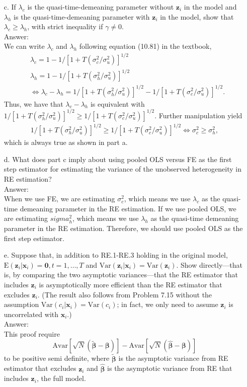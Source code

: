 \documentclass[10pt]{article}
\newcommand{\E}{\text{E}}
\newcommand{\V}{\text{Var}}
\newcommand{\Av}{\text{Avar}}
\begin{document}
\begin{enumerate}
\item[c.] If $\lambda_c$ is the quasi-time-demeaning parameter without $\textbf{z}_i$ in the model and $\lambda_h$ is the quasi-time-demeaning parameter with $\textbf{z}_i$ in the model, show that $\lambda_c\geq\lambda_h$, with strict inequality if $\gamma\neq0$. 
\\ Answer: \\
We can write $\lambda_c$ and $\lambda_h$ following equation (10.81) in the textbook,
\begin{align*}
    &\lambda_c=1-{1/[1+T(\sigma_c^2/\sigma_u^2)]}^{1/2}\\
    &\lambda_h=1-{1/[1+T(\sigma_h^2/\sigma_u^2)]}^{1/2}\\
    &\Leftrightarrow \lambda_c-\lambda_h={1/[1+T(\sigma_h^2/\sigma_u^2)]}^{1/2}-{1/[1+T(\sigma_c^2/\sigma_u^2)]}^{1/2}.
\end{align*}
Thus, we have that $\lambda_c-\lambda_h$ is equivalent with ${1/[1+T(\sigma_h^2/\sigma_u^2)]}^{1/2}\geq{1/[1+T(\sigma_c^2/\sigma_u^2)]}^{1/2}$. Further manipulation yield
\begin{align*}
    {1/[1+T(\sigma_h^2/\sigma_u^2)]}^{1/2}\geq{1/[1+T(\sigma_c^2/\sigma_u^2)]}^{1/2}\Leftrightarrow
    \sigma_c^2\geq\sigma_h^2,
\end{align*}
which is always true as shown in part a.

\item[d.] What does part c imply about using pooled OLS versus FE as the first step estimator for estimating the variance of the unobserved heterogeneity in RE estimation? 
\\ Answer: \\
When we use FE, we are estimating $\sigma_c^2$, which means we use $\lambda_c$ as the quasi-time demeaning parameter in the RE estimation. If we use pooled OLS, we are estimating $sigma_h^2$, which means we use  $\lambda_h$ as the quasi-time demeaning parameter in the RE estimation. Therefore, we should use pooled OLS as the first step estimator.

\item[e.] Suppose that, in addition to RE.1-RE.3 holding in the original model, $\E(\textbf{z}_i|\textbf{x}_i)=\textbf{0}, t=1,\ldots,T$ and $\V(\textbf{z}_i|\textbf{x}_i)=\V(\textbf{z}_i)$. Show directly---that is, by comparing the two asymptotic variances---that the RE estimator that includes $\textbf{z}_i$ is asymptotically more efficient than the RE estimator that excludes $\textbf{z}_i$. (The result also follows from Problem 7.15 without the assumption $\V(c_i|\textbf{x}_i)=\V(c_i)$; in fact, we only need to assume $\textbf{z}_i$ is uncorrelated with $\textbf{x}_i$.)
\\ Answer: \\
This proof require 
\[\Av[\sqrt{N}(\tilde{\pmb{\beta}}-\pmb{\beta})]-\Av[\sqrt{N}(\hat{\pmb{\beta}}-\pmb{\beta})]\]
to be positive semi definite, where $\tilde{\pmb{\beta}}$ is the asymptotic variance from RE estimator that excludes $\textbf{z}_i$ and $\hat{\pmb{\beta}}$ is the asymptotic variance from RE that includes $\textbf{z}_i$, the full model.

\end{enumerate}
\end{document}
